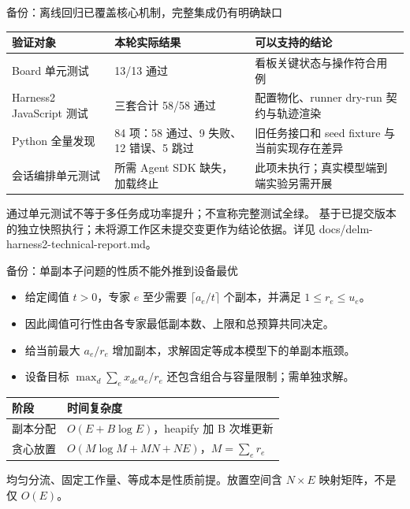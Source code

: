 \documentclass[aspectratio=169,10pt]{beamer}
\newcommand{\src}[1]{\vfill{\fontsize{6.7}{8}\selectfont\color{Muted}#1}\par}
\newcommand{\warn}[1]{\textcolor{Amber}{#1}}
\begin{document}
\begin{frame}{备份：离线回归已覆盖核心机制，完整集成仍有明确缺口}
\renewcommand{\arraystretch}{1.6}
\begin{tabularx}{\textwidth}{@{}lYY@{}}
\toprule 验证对象 & 本轮实际结果 & 可以支持的结论 \\
\midrule
Board 单元测试 & 13/13 通过 & 看板关键状态与操作符合用例 \\
Harness2 JavaScript 测试 & 三套合计 58/58 通过 & 配置物化、runner dry-run 契约与轨迹渲染 \\
Python 全量发现 & 84 项：58 通过、9 失败、12 错误、5 跳过 & 旧任务接口和 seed fixture 与当前实现存在差异 \\
会话编排单元测试 & 所需 Agent SDK 缺失，加载终止 & 此项未执行；真实模型端到端实验另需开展 \\
\bottomrule
\end{tabularx}
\medskip
\warn{通过单元测试不等于多任务成功率提升；不宣称完整测试全绿。}
\src{基于已提交版本的独立快照执行；未将源工作区未提交变更作为结论依据。详见 docs/delm-harness2-technical-report.md。}
\end{frame}

\begin{frame}{备份：单副本子问题的性质不能外推到设备最优}
\begin{itemize}
\item 给定阈值 $t>0$，专家 $e$ 至少需要 $\lceil a_e/t\rceil$ 个副本，并满足 $1\le r_e\le u_e$。
\item 因此阈值可行性由各专家最低副本数、上限和总预算共同决定。
\item 给当前最大 $a_e/r_e$ 增加副本，求解固定等成本模型下的单副本瓶颈。
\item 设备目标 $\max_d\sum_e x_{de}a_e/r_e$ 还包含组合与容量限制；需单独求解。
\end{itemize}
\medskip
\renewcommand{\arraystretch}{1.4}
\begin{tabularx}{\textwidth}{@{}lY@{}}
\toprule 阶段 & 时间复杂度 \\
\midrule
副本分配 & $O(E+B\log E)$，heapify 加 B 次堆更新 \\
贪心放置 & $O(M\log M+MN+NE)$，$M=\sum_e r_e$ \\
\bottomrule
\end{tabularx}
\src{均匀分流、固定工作量、等成本是性质前提。放置空间含 $N\times E$ 映射矩阵，不是仅 $O(E)$。}
\end{frame}
\end{document}
